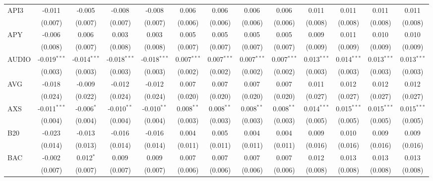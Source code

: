 \begin{table}[!htbp]
\begin{tabular}{@{\extracolsep{5pt}}lcccccccccccc}
 API3 & -0.011$^{}$ & -0.005$^{}$ & -0.008$^{}$ & -0.008$^{}$ & 0.006$^{}$ & 0.006$^{}$ & 0.006$^{}$ & 0.006$^{}$ & 0.011$^{}$ & 0.011$^{}$ & 0.011$^{}$ & 0.011$^{}$ \\
  & (0.007) & (0.007) & (0.007) & (0.007) & (0.006) & (0.006) & (0.006) & (0.006) & (0.008) & (0.008) & (0.008) & (0.008) \\
 APY & -0.006$^{}$ & 0.006$^{}$ & 0.003$^{}$ & 0.003$^{}$ & 0.005$^{}$ & 0.005$^{}$ & 0.005$^{}$ & 0.005$^{}$ & 0.009$^{}$ & 0.011$^{}$ & 0.010$^{}$ & 0.010$^{}$ \\
  & (0.008) & (0.007) & (0.008) & (0.008) & (0.007) & (0.007) & (0.007) & (0.007) & (0.009) & (0.009) & (0.009) & (0.009) \\
 AUDIO & -0.019$^{***}$ & -0.014$^{***}$ & -0.018$^{***}$ & -0.018$^{***}$ & 0.007$^{***}$ & 0.007$^{***}$ & 0.007$^{***}$ & 0.007$^{***}$ & 0.013$^{***}$ & 0.014$^{***}$ & 0.013$^{***}$ & 0.013$^{***}$ \\
  & (0.003) & (0.003) & (0.003) & (0.003) & (0.002) & (0.002) & (0.002) & (0.002) & (0.003) & (0.003) & (0.003) & (0.003) \\
 AVG & -0.018$^{}$ & -0.009$^{}$ & -0.012$^{}$ & -0.012$^{}$ & 0.007$^{}$ & 0.007$^{}$ & 0.007$^{}$ & 0.007$^{}$ & 0.011$^{}$ & 0.012$^{}$ & 0.012$^{}$ & 0.012$^{}$ \\
  & (0.024) & (0.022) & (0.024) & (0.024) & (0.020) & (0.020) & (0.020) & (0.020) & (0.027) & (0.027) & (0.027) & (0.027) \\
 AXS & -0.011$^{***}$ & -0.006$^{*}$ & -0.010$^{**}$ & -0.010$^{**}$ & 0.008$^{**}$ & 0.008$^{**}$ & 0.008$^{**}$ & 0.008$^{**}$ & 0.014$^{***}$ & 0.015$^{***}$ & 0.015$^{***}$ & 0.015$^{***}$ \\
  & (0.004) & (0.004) & (0.004) & (0.004) & (0.003) & (0.003) & (0.003) & (0.003) & (0.005) & (0.005) & (0.005) & (0.005) \\
 B20 & -0.023$^{}$ & -0.013$^{}$ & -0.016$^{}$ & -0.016$^{}$ & 0.004$^{}$ & 0.005$^{}$ & 0.004$^{}$ & 0.004$^{}$ & 0.009$^{}$ & 0.010$^{}$ & 0.009$^{}$ & 0.009$^{}$ \\
  & (0.014) & (0.013) & (0.014) & (0.014) & (0.011) & (0.011) & (0.011) & (0.011) & (0.016) & (0.016) & (0.016) & (0.016) \\
 BAC & -0.002$^{}$ & 0.012$^{*}$ & 0.009$^{}$ & 0.009$^{}$ & 0.007$^{}$ & 0.007$^{}$ & 0.007$^{}$ & 0.007$^{}$ & 0.012$^{}$ & 0.013$^{}$ & 0.013$^{}$ & 0.013$^{}$ \\
  & (0.007) & (0.007) & (0.007) & (0.007) & (0.006) & (0.006) & (0.006) & (0.006) & (0.008) & (0.008) & (0.008) & (0.008) \\

\end{tabular}
\end{table}

